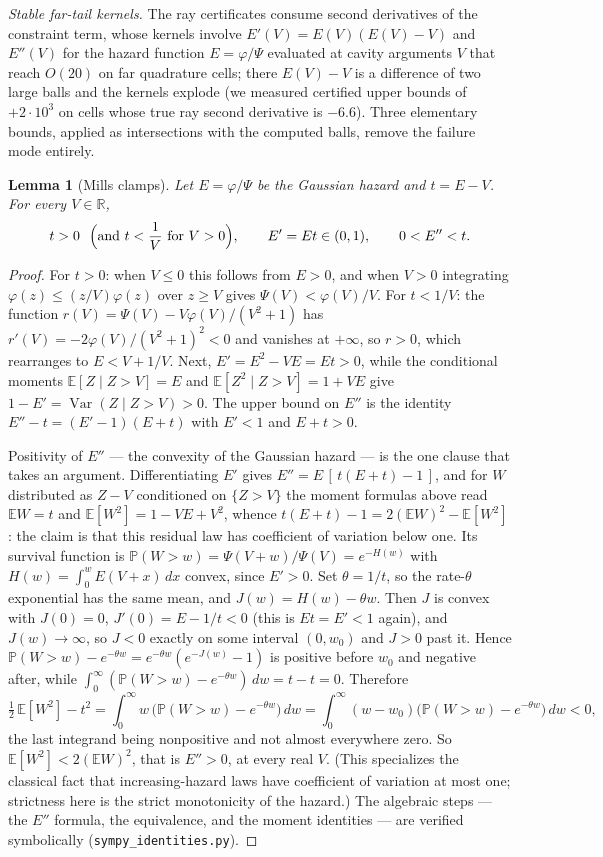 \documentclass[11pt]{article}
\newtheorem{lemma}{Lemma}
\theoremstyle{remark}
\newcommand{\E}{\mathbb{E}}
\newcommand{\Prob}{\mathbb{P}}
\newcommand{\R}{\mathbb{R}}
\begin{document}
\emph{Stable far-tail kernels.}  The ray certificates consume second
derivatives of the constraint term, whose kernels involve
$E'(V)=E(V)(E(V)-V)$ and $E''(V)$ for the hazard function
$E=\varphi/\Psi$ evaluated at cavity arguments $V$ that reach
$O(20)$ on far quadrature cells; there $E(V)-V$ is a difference of
two large balls and the kernels explode (we measured certified
upper bounds of $+2\cdot10^{3}$ on cells whose true ray second
derivative is $-6.6$).  Three elementary bounds, applied as
intersections with the computed balls, remove the failure mode
entirely.

\begin{lemma}[Mills clamps]\label{lem:mills}
Let $E=\varphi/\Psi$ be the Gaussian hazard and $t=E-V$.  For every
$V\in\R$,
\[
t>0\ \ \Bigl(\text{and } t<\frac1V \text{ for } V>0\Bigr),\qquad
E'=Et\in(0,1),\qquad
0<E''<t .
\]
\end{lemma}

\begin{proof}
For $t>0$: when $V\le0$ this follows from $E>0$, and when $V>0$ integrating
$\varphi(z)\le(z/V)\varphi(z)$ over $z\ge V$ gives
$\Psi(V)<\varphi(V)/V$.  For $t<1/V$: the function
$r(V)=\Psi(V)-V\varphi(V)/(V^2+1)$ has
$r'(V)=-2\varphi(V)/(V^2+1)^2<0$ and vanishes at $+\infty$, so $r>0$,
which rearranges to $E<V+1/V$.  Next, $E'=E^2-VE=Et>0$, while the
conditional moments $\E[Z\mid Z>V]=E$ and $\E[Z^2\mid Z>V]=1+VE$ give
$1-E'=\operatorname{Var}(Z\mid Z>V)>0$.  The upper bound on $E''$ is
the identity $E''-t=(E'-1)(E+t)$ with $E'<1$ and $E+t>0$.

Positivity of $E''$ --- the convexity of the Gaussian hazard --- is
the one clause that takes an argument.  Differentiating $E'$ gives
$E''=E\,[\,t(E+t)-1\,]$, and for $W$ distributed as $Z-V$ conditioned
on $\{Z>V\}$ the moment formulas above read $\E W=t$ and
$\E[W^2]=1-VE+V^2$, whence $t(E+t)-1=2(\E W)^2-\E[W^2]$: the claim is
that this residual law has coefficient of variation below one.  Its
survival function is
$\Prob(W>w)=\Psi(V+w)/\Psi(V)=e^{-H(w)}$ with
$H(w)=\int_0^w E(V+x)\,dx$ convex, since $E'>0$.  Set $\theta=1/t$,
so the rate-$\theta$ exponential has the same mean, and
$J(w)=H(w)-\theta w$.  Then $J$ is convex with $J(0)=0$,
$J'(0)=E-1/t<0$ (this is $Et=E'<1$ again), and $J(w)\to\infty$, so
$J<0$ exactly on some interval $(0,w_0)$ and $J>0$ past it.  Hence
$\Prob(W>w)-e^{-\theta w}=e^{-\theta w}(e^{-J(w)}-1)$ is positive
before $w_0$ and negative after, while
$\int_0^\infty(\Prob(W>w)-e^{-\theta w})\,dw=t-t=0$.  Therefore
\[
\tfrac12\,\E[W^2]-t^2
=\int_0^\infty w\,\bigl(\Prob(W>w)-e^{-\theta w}\bigr)\,dw
=\int_0^\infty (w-w_0)\bigl(\Prob(W>w)-e^{-\theta w}\bigr)\,dw<0,
\]
the last integrand being nonpositive and not almost everywhere zero.
So $\E[W^2]<2(\E W)^2$, that is $E''>0$, at every real $V$.  (This
specializes the classical fact that increasing-hazard laws have
coefficient of variation at most one; strictness here is the strict
monotonicity of the hazard.)  The algebraic steps --- the $E''$
formula, the equivalence, and the moment identities --- are verified
symbolically (\texttt{sympy\_identities.py}).
\end{proof}
\end{document}
